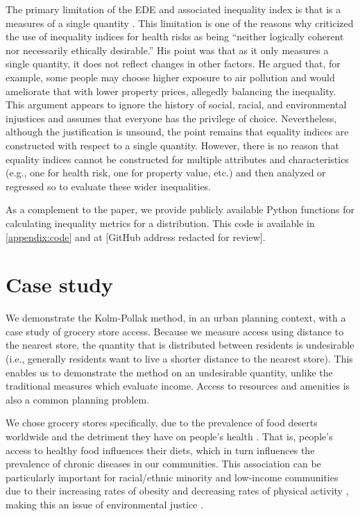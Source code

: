 \documentclass[final,3p,times,onecolumn,sort&compress]{elsarticle}
\begin{document}
The primary limitation of the EDE and associated inequality index is that is a measures of a single quantity \citep{Sheriff2020-ge, Cox2012-lg}.
This limitation is one of the reasons why \cite{Cox2012-lg} criticized the use of inequality indices for health risks as being ``neither logically coherent nor necessarily ethically desirable.''
His point was that as it only measures a single quantity, it does not reflect changes in other factors. 
He argued that, for example, some people may choose higher exposure to air pollution and would ameliorate that with lower property prices, allegedly balancing the inequality. 
This argument appears to ignore the history of social, racial, and environmental injustices and assumes that everyone has the privilege of choice.
Nevertheless, although the justification is unsound, the point remains that equality indices are constructed with respect to a single quantity.
However, there is no reason that equality indices cannot be constructed for multiple attributes and characteristics (e.g., one for health risk, one for property value, etc.) and then analyzed or regressed so to evaluate these wider inequalities.


As a complement to the paper, we provide publicly available Python functions for calculating inequality metrics for a distribution. 
This code is available in \ref{appendix:code} and at [GitHub address redacted for review].

\section{Case study}
\label{sec:case}
We demonstrate the Kolm-Pollak method, in an urban planning context, with a case study of grocery store access. 
Because we measure access using distance to the nearest store, the quantity that is distributed between residents is undesirable (i.e., generally residents want to live a shorter distance to the nearest store).
This enables us to demonstrate the method on an undesirable quantity, unlike the traditional measures which evaluate income.
Access to resources and amenities is also a common planning problem. 

We chose grocery stores specifically, due to the prevalence of food deserts worldwide and the detriment they have on people's health \citep{Kolak2018-az, Garcia2020-xt,Apparicio2007-di, Walker2010-ch}.
That is, people's access to healthy food influences their diets, which in turn influences the prevalence of chronic diseases in our communities.
This association can be particularly important for racial/ethnic minority and low-income communities due to their increasing rates of obesity and decreasing rates of physical activity \citep{Krenichyn2006-ve,Day2006-ak}, making this an issue of environmental justice \citep{Kolak2018-az, Walker2010-ch}.
\end{document}

